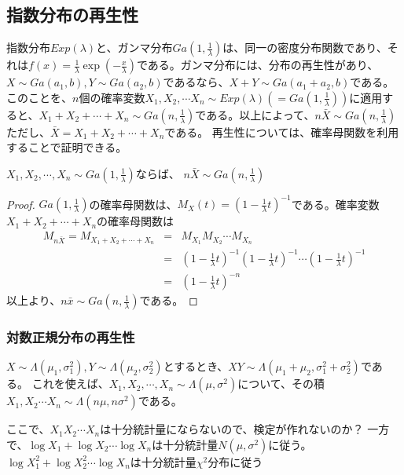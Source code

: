 \subsection{指数分布の再生性}
指数分布$Exp(\lambda)$と、ガンマ分布$Ga(1,\frac{1}{\lambda})$は、同一の密度分布関数であり、それは$f(x) = \frac{1}{\lambda} \exp(-\frac{x}{\lambda})$である。ガンマ分布には、分布の再生性があり、$X\sim Ga(a_1,b),Y\sim Ga(a_2,b)$であるなら、$X+Y \sim Ga(a_1+a_2,b)$である。このことを、$n$個の確率変数$X_1,X_2,\cdots X_n \sim Exp(\lambda)(=Ga(1,\frac{1}{\lambda}) )$に適用すると、$X_1+X_2+\cdots+X_n \sim Ga(n,\frac{1}{\lambda})$である。以上によって、$n\bar{X}\sim Ga(n,\frac{1}{\lambda})$ただし、$\bar{X}=X_1+X_2+\cdots+X_n$である。
再生性については、確率母関数を利用することで証明できる。

\begin{theo}
    $X_1,X_2,\cdots,X_n \sim Ga(1,\frac{1}{\lambda})$ならば、
    $n\bar{X}\sim Ga(n,\frac{1}{\lambda})$
\end{theo}

\begin{proof}
    $Ga(1,\frac{1}{\lambda})$の確率母関数は、$M_X(t)=(1-\frac{1}{\lambda}t)^{-1}$である。確率変数$X_1+X_2+\cdots+X_n$の確率母関数は
    \begin{eqnarray}
        M_{n\bar{X}} = M_{X_1+X_2+\cdots+X_n} &=& M_{X_1}M_{X_2}\cdots M_{X_n} \\
        &=& (1-\frac{1}{\lambda}t)^{-1}(1-\frac{1}{\lambda}t)^{-1}\cdots(1-\frac{1}{\lambda}t)^{-1}\\
        &=& (1-\frac{1}{\lambda}t)^{-n}
    \end{eqnarray}
    以上より、$n\bar{x}\sim Ga(n,\frac{1}{\lambda})$である。
\end{proof}

\subsubsection{対数正規分布の再生性}
$X\sim \Lambda(\mu_1,\sigma_1^2), Y\sim \Lambda(\mu_2,\sigma^2_2)$とするとき、$XY\sim\Lambda(\mu_1+\mu_2,\sigma_1^2+\sigma_2^2)$である。
これを使えば、$X_1,X_2,\cdots,X_n \sim \Lambda(\mu,\sigma^2)$について、その積$X_1,X_2\cdots X_n \sim \Lambda(n\mu,n\sigma^2)$である。

ここで、$X_1X_2\cdots X_n$は十分統計量にならないので、検定が作れないのか？
一方で、$\log X_1+\log X_2 \cdots \log X_n $は十分統計量$N(\mu,\sigma^2)$に従う。
$\log X_1^2+\log X_2^2 \cdots \log X_n $は十分統計量$\chi^2$分布に従う
\fi

